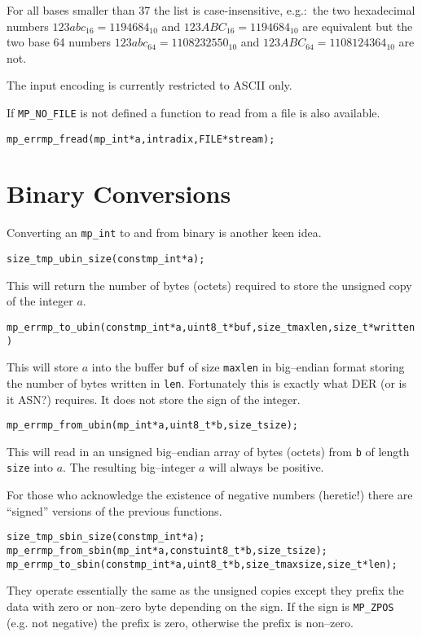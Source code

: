 \documentclass[synpaper]{book}
\begin{document}
For all bases smaller than 37 the list is case-insensitive, e.g.:~the two hexadecimal numbers
$123abc_{16} = 1194684_{10}$ and $123ABC_{16} = 1194684_{10}$ are equivalent but the two base
64 numbers $123abc_{64} = 1108232550_{10}$ and $123ABC_{64} = 1108124364_{10}$ are not.

The input encoding is currently restricted to ASCII only.

If \texttt{MP\_NO\_FILE} is not defined a function to read from a file is also available.
\begin{alltt}
mp_err mp_fread(mp_int *a, int radix, FILE *stream);
\end{alltt}

\section{Binary Conversions}

Converting an \texttt{mp\_int} to and from binary is another keen idea.

\begin{alltt}
size_t mp_ubin_size(const mp_int *a);
\end{alltt}

This will return the number of bytes (octets) required to store the unsigned copy of the integer
$a$.

\begin{alltt}
mp_err mp_to_ubin(const mp_int *a, uint8_t *buf, size_t maxlen, size_t *written)
\end{alltt}
This will store $a$ into the buffer \texttt{buf} of size \texttt{maxlen} in big--endian format
storing the number of bytes written in \texttt{len}.  Fortunately this is exactly what DER (or is
it ASN?) requires.  It does not store the sign of the integer.

\begin{alltt}
mp_err mp_from_ubin(mp_int *a, uint8_t *b, size_t size);
\end{alltt}
This will read in an unsigned big--endian array of bytes (octets) from \texttt{b} of length
\texttt{size} into $a$.  The resulting big--integer $a$ will always be positive.

For those who acknowledge the existence of negative numbers (heretic!) there are ``signed''
versions of the previous functions.
  
\begin{alltt}
size_t mp_sbin_size(const mp_int *a);
mp_err mp_from_sbin(mp_int *a, const uint8_t *b, size_t size);
mp_err mp_to_sbin(const mp_int *a, uint8_t *b, size_t maxsize, size_t *len);
\end{alltt}
They operate essentially the same as the unsigned copies except they prefix the data with zero or
non--zero byte depending on the sign. If the sign is \texttt{MP\_ZPOS} (e.g. not negative) the
prefix is zero, otherwise the prefix is non--zero.
\end{document}
